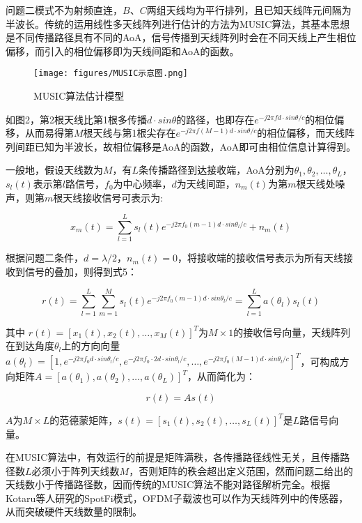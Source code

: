 \documentclass[withoutpreface,bwprint]{cumcmthesis}
\begin{document}
问题二模式不为射频直连，$B$、$C$两组天线均为平行排列，且已知天线阵元间隔为半波长。传统的运用线性多天线阵列进行估计的方法为MUSIC算法，其基本思想是不同传播路径具有不同的AoA，信号传播到天线阵列时会在不同天线上产生相位偏移，而引入的相位偏移即为天线间距和AoA的函数。

\begin{figure}[h]
\caption{MUSIC算法估计模型} \label{fig:aa}
\centering
\texttt{[image: figures/MUSIC示意图.png]}
\end{figure}

如图2，第2根天线比第1根多传播$d\cdot sin\theta$的路径，也即存在$e^{-j2\pi fd\cdot sin\theta/c}$的相位偏移，从而易得第$M$根天线与第1根尖存在$e^{-j2\pi f(M-1)d\cdot sin\theta/c}$的相位偏移，而天线阵列间距已知为半波长，故相位偏移是AoA的函数，AoA即可由相位信息计算得到。

一般地，假设天线数为$M$，有$L$条传播路径到达接收端，AoA分别为${\theta_{1},\theta_{2},\dots,\theta_{L}}$，$s_{l}(t)$表示第$l$路信号，$f_{0}$为中心频率，$d$为天线间距，$n_{m}(t)$为第$m$根天线处噪声，则第$m$根天线接收信号可表示为:

\begin{equation}
    x_{m}(t)=\sum_{l=1}^{L}s_{l}(t)e^{-j2\pi f_{0}(m-1)d\cdot sin\theta_{l}/c}+n_{m}(t)
\end{equation}

根据问题二条件，$d=\lambda/2$，$n_{m}(t)=0$，将接收端的接收信号表示为所有天线接收到信号的叠加，则得到式5：

\begin{equation}
    r(t)=\sum_{l=1}^{L}\sum_{m=1}^{M}s_{l}(t)e^{-j2\pi f_{0}(m-1)d\cdot sin\theta_{l}/c}=\sum_{l=1}^{L}a(\theta_{l})s_{l}(t)
\end{equation}

其中 $r(t)=[x_{1}(t),x_{2}(t),\dots,x_{M}(t)]^{T}$为$M\times1$的接收信号向量，天线阵列在到达角度$\theta_{l}$上的方向向量$a(\theta_{l})=[1,e^{-j2\pi f_{0}d\cdot sin\theta_{l}/c},e^{-j2\pi f_{0}\cdot 2d\cdot sin\theta_{l}/c},\dots,e^{-j2\pi f_{0}(M-1)d\cdot sin\theta_{l}/c}]^{T}$，可构成方向矩阵$A=[a(\theta_{1}),a(\theta_{2}),\dots,a(\theta_{L})]^{T}$，从而简化为：

\begin{equation}
    r(t)=As(t)
\end{equation}

$A$为$M\times L$的范德蒙矩阵，$s(t)=[s_{1}(t),s_{2}(t),\dots,s_{L}(t)]^{T}$是$L$路信号向量。

在MUSIC算法中，有效运行的前提是矩阵满秩，各传播路径线性无关，且传播路径数$L$必须小于阵列天线数$M$，否则矩阵的秩会超出定义范围，然而问题二给出的天线数小于传播路径数，因而传统的MUSIC算法不能对路径解析完全。根据Kotaru等人研究的SpotFi模式，OFDM子载波也可以作为天线阵列中的传感器，从而突破硬件天线数量的限制。
\end{document}
